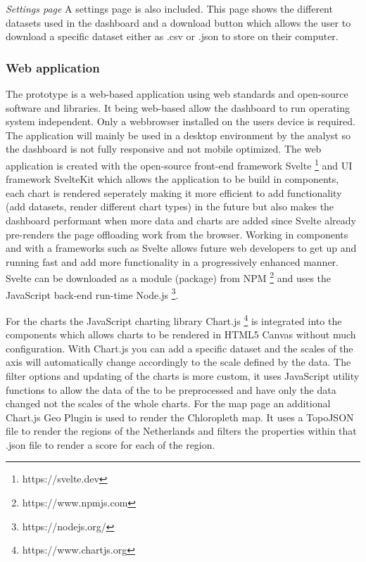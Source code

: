 \textit{Settings page}\newline
A settings page is also included. This page shows the different datasets used in the dashboard and a download button which allows the user to download a specific dataset either as .csv or .json to store on their computer.

\subsubsection{Web application}\hfill
The prototype is a web-based application using web standards and open-source software and libraries. It being web-based allow the dashboard to run operating system independent. Only a webbrowser installed on the users device is required. The application will mainly be used in a desktop environment by the analyst so the dashboard is not fully responsive and not mobile optimized. The web application is created with the open-source front-end framework Svelte \footnote{https://svelte.dev} and UI framework SvelteKit which allows the application to be build in components, each chart is rendered seperately making it more efficient to add functionality (add datasets, render different chart types) in the future but also makes the dashboard performant when more data and charts are added since Svelte already pre-renders the page offloading work from the browser. Working in components and with a frameworks such as Svelte allows future web developers to get up and running fast and add more functionality in a progressively enhanced manner. Svelte can be downloaded as a module (package) from NPM \footnote{https://www.npmjs.com} and uses the JavaScript back-end run-time Node.js \footnote{https://nodejs.org/}. 

For the charts the JavaScript charting library Chart.js \footnote{https://www.chartjs.org} is integrated into the components which allows charts to be rendered in HTML5 Canvas without much configuration. With Chart.js you can add a specific dataset and the scales of the axis will automatically change accordingly to the scale defined by the data. The filter options and updating of the charts is more custom, it uses JavaScript utility functions to allow the data of the to be preprocessed and have only the data changed not the scales of the whole charts. For the map page an additional Chart.js Geo Plugin is used to render the Chloropleth map. It uses a TopoJSON file to render the regions of the Netherlands and filters the properties within that .json file to render a score for each of the region.

